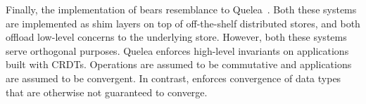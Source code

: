 Finally, the implementation of \quark bears resemblance to
Quelea~\cite{pldi15}. Both these systems are implemented as shim
layers on top of off-the-shelf distributed stores, and both offload
low-level concerns to the underlying store. However, both these
systems serve orthogonal purposes. Quelea enforces high-level
invariants on applications built with CRDTs. Operations are assumed to
be commutative and applications are assumed to be convergent. In
contrast, \quark enforces convergence of data types that are otherwise
not guaranteed to converge.
